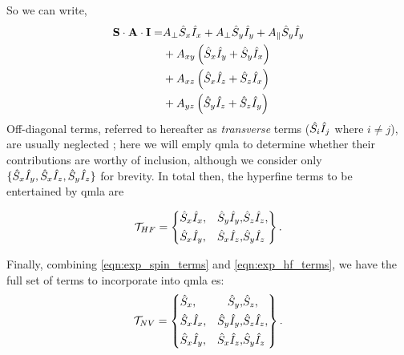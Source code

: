 So we can write, 
\begin{equation}
    \begin{split}
        \mathbf{S} \cdot \mathbf{A} \cdot \mathbf{I} 
        = &A_{\perp} \hat{S}_x \hat{I}_x + A_{\perp} \hat{S}_y \hat{I}_y + A_{\|} \hat{S}_y \hat{I}_y \\
        &+ A_{xy} \left( \hat{S}_x \hat{I}_y + \hat{S}_y \hat{I}_x \right) \\
        &+ A_{xz} \left( \hat{S}_x \hat{I}_z + \hat{S}_z \hat{I}_x \right) \\
        &+ A_{yz} \left( \hat{S}_y \hat{I}_z + \hat{S}_z \hat{I}_y \right) \\
    \end{split}
\end{equation}
Off-diagonal terms, referred to hereafter as \emph{transverse} terms ($\hat{S_i}\hat{I}_j$ where $i\neq j$),
    are usually neglected \cite{blok2014manipulating}; 
    here we will emply \gls{qmla} to determine whether their contributions are worthy of inclusion, 
    although we consider only $\{ \hat{S}_x\hat{I}_y, \hat{S}_x\hat{I}_z, \hat{S}_y\hat{I}_z\}$ for brevity. 
In total then, the hyperfine terms to be entertained by \gls{qmla} are 

\begin{equation}
    \label{eqn:exp_hf_terms}
    { \mathcal{T} }_{HF} = \left\{
        \begin{split}
        & \hat{S}_x\hat{I}_x, & \hat{S}_y\hat{I}_y, & \hat{S}_z\hat{I}_z, \\
        & \hat{S}_x\hat{I}_y, & \hat{S}_x\hat{I}_z, & \hat{S}_y\hat{I}_z 
        \end{split}
    \right\}.
\end{equation}

\par 

Finally, combining \cref{eqn:exp_spin_terms} and \cref{eqn:exp_hf_terms}, 
    we have the full set of terms to incorporate into \gls{qmla} \gls{es}: 
\begin{equation}
    \label{eqn:nv_terms_verbose}
    { \mathcal{T} }_{NV} = \left\{
        \begin{split}
            &\hat{S}_x,  & \hat{S}_y,  & \hat{S}_z, \\
            &\hat{S}_x \hat{I}_x,  & \hat{S}_y\hat{I}_y, & \hat{S}_z\hat{I}_z, \\
            &\hat{S}_x\hat{I}_y,  & \hat{S}_x\hat{I}_z,  & \hat{S}_y\hat{I}_z \\
        \end{split}
    \right\}.
\end{equation}
\par 

